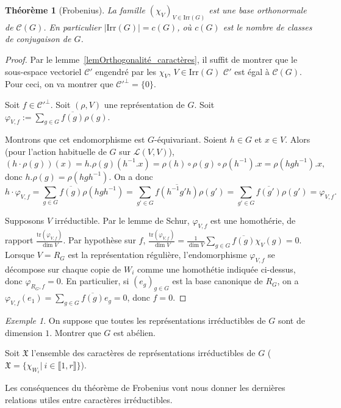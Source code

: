 \documentclass[a4paper]{article}
\theoremstyle{definition} %
\theoremstyle{plain} %
\newtheorem{Thm}[Def]{Théorème} %
\theoremstyle{remark} %
\newtheorem{Ex}[Def]{Exemple} %
\newcommand{\Irr}{\mathrm{Irr}(G)}
\begin{document}
\begin{Thm}[Frobenius]
La famille $(\chi_V)_{V\in \Irr}$ est une base orthonormale de $\mathcal{C}(G)$. En particulier $|\Irr|=c(G)$, où $c(G)$ est le nombre de classes de conjugaison de $G$.
\end{Thm}

\begin{proof}
	Par le lemme~\ref{lemOrthogonalité_caractères}, il suffit de montrer que le sous-espace vectoriel $\mathcal{C}'$ engendré par les $\chi_{V}$, $V\in \Irr$ $\mathcal{C}'$ est égal à $\mathcal{C}(G)$. 	 
	Pour ceci, on va montrer que $\mathcal{C}'^\perp=\{0\}$.
	 
	 Soit $f\in \mathcal{C}'^\perp$.
	Soit $(\rho,V)$ une représentation de $G$. Soit
	 $\displaystyle \varphi_{V,f} := \sum_{g \in G} \overline{f(g)} \rho(g)$.
	 
	 
	Montrons que cet endomorphisme est $G$-équivariant. Soient $h \in G$ et $x\in V$. Alors (pour l'action habituelle de $G$ sur $\mathcal{L}(V,V)$), \[(h \cdot \rho(g))(x)=h.\rho(g)(h^{-1}.x)=\rho(h)\circ\rho(g)\circ\rho(h^{-1}).x=\rho(hgh^{-1}).x,\]  donc  $h.\rho(g)=\rho(hgh^{-1})$. On a donc
	$$h \cdot \varphi_{V,f} = \sum_{g \in G} \overline{f(g)} \rho(hgh^{-1}) = \sum_{g' \in G} \overline{f(h^{-1} g' h)} \rho(g') =  \sum_{g' \in G} \overline{f(g')} \rho(g') = \varphi_{V,f}.$$
	
Supposons $V$ irréductible. Par le lemme de Schur, $\varphi_{V,f}$ est une homothérie, de rapport $\frac{\mathrm{tr}(\varphi_{V,f})}{\dim V}$.
	Par  hypothèse sur $f$, 
	$\frac{\mathrm{tr}(\varphi_{V,f})}{\dim V}=\displaystyle \frac{1}{\dim V} \sum_{g \in G} \overline{f(g)} \chi_{V}(g) = 0$.
	Lorsque $V=R_G$ est la représentation régulière, l'endomorphisme $\varphi_{V,f}$ se décompose sur chaque copie de $W_i$ comme une homothétie indiquée ci-dessus, donc $\varphi_{R_G,f} = 0$.
	En particulier, si $(e_g)_{g \in G}$ est la base canonique de $R_G$, on a $\varphi_{V,f}(e_1)=\displaystyle \sum_{g \in G} \overline{f(g)} e_{g} = 0$, donc $f=0$.
\end{proof}

\begin{Ex}
On suppose que toutes les représentations irréductibles de $G$ sont de dimension $1$. Montrer que $G$ est abélien.
\end{Ex}

Soit $\mathfrak{X}$ l'ensemble des caractères de représentations irréductibles de $G$ ($\mathfrak{X}=\{\chi_{W_i}|\ i\in \llbracket 1,r \rrbracket\}$).

Les conséquences du théorème de Frobenius vont nous donner les dernières relations utiles entre caractères irréductibles.
\end{document}
